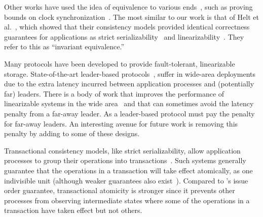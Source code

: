 Other works have used the idea of equivalence to various
ends~\cite{goldman1993unifiedModel,lundelius1984clocksync,
fischer1985flp,attiya1993seqlin},
such as proving bounds on clock
synchronization~\cite{lundelius1984clocksync}.
The most similar to our work is that of Helt et
al.~\cite{helt2021rss}, which showed that their consistency
models provided identical correctness guarantees for applications
as strict serializability~\cite{papadimitriou1979serializability} and linearizability~\cite{herlihy1990linearizability}.
They refer to this as ``invariant equivalence.'' 


 Many protocols have been developed to provide fault-tolerant, linearizable storage.
State-of-the-art leader-based
protocols~\cite{ongaro2014raft,lamport1998paxos,oki1988vr},
suffer in wide-area deployments due to the extra
latency incurred between application processes and (potentially far)
leaders.
There is a body of work that improves the performance of
linearizable systems in the wide
area~\cite{mao2008mencius,moraru2013epaxos,burke2020gryff} and that can sometimes avoid the latency penalty from a far-away leader.
As a leader-based protocol \sys{} must pay the penalty for far-away leaders.
An interesting avenue for future work is removing this penalty by adding \mdl{} to some of these designs.

Transactional consistency models, like strict serializability,
allow application processes to group their operations into
transactions~\cite{papadimitriou1979serializability}. Such
systems generally guarantee that the operations in a transaction
will take effect atomically, as one indivisible unit (although weaker 
guarantees also exist~\cite{adya1999weakcons}).
Compared to \MDL{}'s issue order guarantee, transactional atomicity 
is stronger since it prevents other processes from observing 
intermediate states where some of the operations in a transaction 
have taken effect but not others. 

